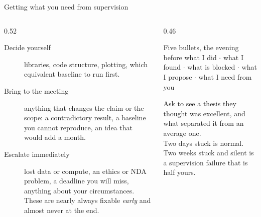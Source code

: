 \documentclass[aspectratio=169,11pt]{beamer}
\begin{document}
\begin{frame}{Getting what you need from supervision}
\begin{columns}[T]
\begin{column}{0.52\textwidth}
\footnotesize
\begin{description}
  \item[Decide yourself] libraries, code structure, plotting, which equivalent
        baseline to run first.
  \item[Bring to the meeting] anything that changes the claim or the scope: a
        contradictory result, a baseline you cannot reproduce, an idea that
        would add a month.
  \item[Escalate immediately] lost data or compute, an ethics or NDA problem,
        a deadline you will miss, anything about your circumstances. These are
        nearly always fixable \emph{early} and almost never at the end.
\end{description}
\end{column}
\begin{column}{0.46\textwidth}
\begin{block}{Five bullets, the evening before}
\footnotesize
what I did $\cdot$ what I found $\cdot$ what is blocked $\cdot$ what I propose
$\cdot$ what I need from you
\end{block}
\footnotesize
Ask to see a thesis they thought was excellent, and what separated it from an
average one.\\[4pt]
Two days stuck is normal. Two weeks stuck and silent is a supervision failure
that is half yours.
\end{column}
\end{columns}
\end{frame}
\end{document}
